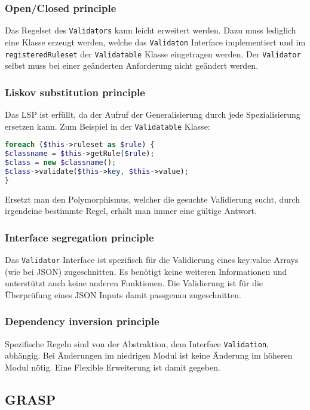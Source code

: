 \documentclass[12pt,a4paper,titlepage,ngerman,pdftex]{report}
\begin{document}
    \subsubsection{Open/Closed principle}
    Das Regelset des \verb|Validators| kann leicht erweitert werden. Dazu muss lediglich eine Klasse erzeugt werden, welche das \verb|Validaton| Interface implementiert und im \verb|registeredRuleset| der \verb|Validatable| Klasse eingetragen werden. Der \verb|Validator| selbst muss bei einer geänderten Anforderung nicht geändert werden.
    \subsubsection{Liskov substitution principle}
    Das LSP ist erfüllt, da der Aufruf der Generalisierung durch jede Spezialisierung ersetzen kann. Zum Beispiel in der \verb|Validatable| Klasse:
    \begin{lstlisting}[language=php,label={lst:lsp},escapechar=\%]
foreach ($this->ruleset as $rule) {
$classname = $this->getRule($rule);
$class = new $classname();
$class->validate($this->key, $this->value);
}
    \end{lstlisting}
	Ersetzt man den Polymorphismus, welcher die gesuchte Validierung sucht, durch irgendeine bestimmte Regel, erhält man immer eine gültige Antwort.
    \subsubsection{Interface segregation principle}
    Das \verb|Validator| Interface ist spezifisch für die Validierung eines key:value Arrays (wie bei JSON) zugeschnitten. Es benötigt keine weiteren Informationen und unterstützt auch keine anderen Funktionen. Die Validierung ist für die Überprüfung eines JSON Inputs damit passgenau zugeschnitten. 
    \subsubsection{Dependency inversion principle}
    Spezifische Regeln sind von der Abstraktion, dem Interface \verb|Validation|, abhängig. Bei Änderungen im niedrigen Modul ist keine Änderung im höheren Modul nötig. Eine Flexible Erweiterung ist damit gegeben.
    \subsection{GRASP}
    \label{subsec:grasp}
\end{document}
